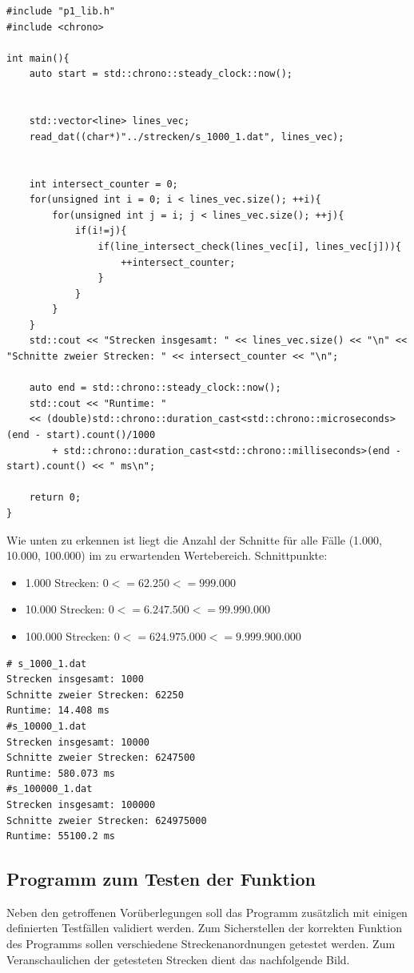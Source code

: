 \documentclass[12pt]{scrartcl}
\begin{document}
\begin{lstlisting}[style=CStyle, caption={strecken.cpp: Aufgruf der Bibliotheksfunktionen},captionpos=b]
#include "p1_lib.h"
#include <chrono>

int main(){
    auto start = std::chrono::steady_clock::now();


    std::vector<line> lines_vec;
    read_dat((char*)"../strecken/s_1000_1.dat", lines_vec);


    int intersect_counter = 0;
    for(unsigned int i = 0; i < lines_vec.size(); ++i){
        for(unsigned int j = i; j < lines_vec.size(); ++j){
            if(i!=j){
                if(line_intersect_check(lines_vec[i], lines_vec[j])){
                    ++intersect_counter;
                }
            }
        }
    }
    std::cout << "Strecken insgesamt: " << lines_vec.size() << "\n" << "Schnitte zweier Strecken: " << intersect_counter << "\n";

    auto end = std::chrono::steady_clock::now();     
    std::cout << "Runtime: " 
    << (double)std::chrono::duration_cast<std::chrono::microseconds>(end - start).count()/1000 
        + std::chrono::duration_cast<std::chrono::milliseconds>(end - start).count() << " ms\n";

    return 0;
}
\end{lstlisting}

Wie unten zu erkennen ist liegt die Anzahl der Schnitte für alle Fälle (1.000, 10.000, 100.000) im zu erwartenden Wertebereich.
Schnittpunkte:    
\begin{itemize}
    \item 1.000 Strecken: $0<= 62.250 <= 999.000$
    \item 10.000 Strecken: $0<= 6.247.500 <= 99.990.000$
    \item 100.000 Strecken: $0<= 624.975.000 <= 9.999.900.000$
\end{itemize}


\begin{lstlisting}[style=Terminal, caption={testing.cpp: Ausgabe Konsole},captionpos=b]
# s_1000_1.dat
Strecken insgesamt: 1000
Schnitte zweier Strecken: 62250
Runtime: 14.408 ms
#s_10000_1.dat
Strecken insgesamt: 10000
Schnitte zweier Strecken: 6247500
Runtime: 580.073 ms
#s_100000_1.dat
Strecken insgesamt: 100000
Schnitte zweier Strecken: 624975000
Runtime: 55100.2 ms
\end{lstlisting}


\subsection{Programm zum Testen der Funktion}
Neben den getroffenen Vorüberlegungen soll das Programm zusätzlich mit einigen definierten Testfällen validiert werden.
Zum Sicherstellen der korrekten Funktion des Programms sollen verschiedene Streckenanordnungen getestet werden.
Zum Veranschaulichen der getesteten Strecken dient das nachfolgende Bild.\\
\end{document}
